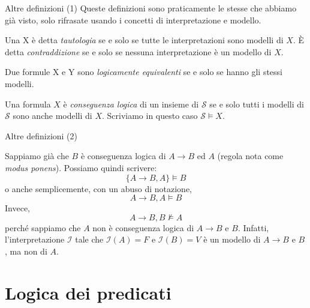 \documentclass[aspectratio=169,10pt,dvipsnames,xcolor=table,handout]{beamer}
\newcommand{\mcI}{\mathcal{I}}
\begin{document}
\begin{frame}{Altre definizioni (1)}
    Queste definizioni sono praticamente le stesse che abbiamo già visto, solo rifrasate usando i concetti di interpretazione e modello.

    \begin{definition}
        Una \fp X è detta \emph{tautologia} se e solo se tutte le interpretazioni sono modelli di $X$. È detta \emph{contraddizione} se e solo se nessuna interpretazione è un modello di $X$.
    \end{definition}

    \begin{definition}
        Due formule \fp X e \fp Y sono \emph{logicamente equivalenti} se e solo se hanno gli stessi modelli.
    \end{definition}

    \begin{definition}
        Una formula \fp $X$ è \emph{conseguenza logica} di un insieme di \fp $\mathcal{S}$ se e solo tutti i modelli di $\mathcal{S}$ sono anche modelli di $X$. Scriviamo in questo caso \textbf{$\mathcal S \models X$}.
    \end{definition}
\end{frame}

\begin{frame}{Altre definizioni (2)}
    \begin{example}
        Sappiamo già che $B$ è conseguenza logica di $A \to B$ ed $A$ (regola nota come \emph{modus ponens}). Possiamo quindi scrivere:
        \[
            \{A \to B, A\} \models B
        \]
        o anche semplicemente, con un abuso di notazione,
        \[
            A \to B, A \models B
        \]
        Invece,
        \[
            A \to B, B \not\models A
        \]
        perché sappiamo che $A$ non è conseguenza logica di $A \to B$ e $B$. Infatti, l'interpretazione $\mcI$ tale che $\mcI(A)=F$ e $\mcI(B)=V$ è un modello di $A \to B$ e $B$, ma non di $A$.
    \end{example}
\end{frame}

\section{Logica dei predicati}
\end{document}
